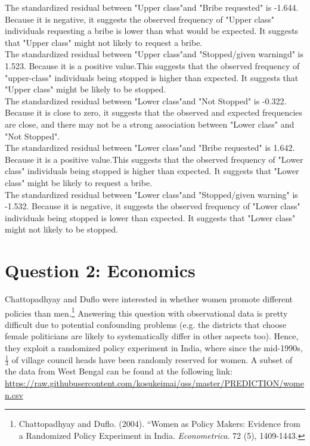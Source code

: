 \documentclass[12pt,letterpaper]{article}
\begin{document}
\begin{enumerate}
	
	The standardized residual between "Upper class"and "Bribe requested" is -1.644.  Because it is negative, it suggests the observed frequency of "Upper class" individuals requesting a bribe is lower than what would be expected. It suggests that "Upper class"  might not likely to request a bribe.\\
	
	
	The standardized residual between "Upper class"and "Stopped/given warningd" is 1.523.  Because it is a positive value.This suggests that the observed frequency of "upper-class" individuals being stopped is higher than expected. It suggests that "Upper class"  might be likely to be stopped.\\
	
	
	The standardized residual between "Lower class"and "Not Stopped" is -0.322.  Because it is close to zero, it suggests that the observed and expected frequencies are close, and there may not be a strong association between  "Lower class" and "Not Stopped".\\
	
	
	The standardized residual between "Lower class"and "Bribe requested" is 1.642.  Because it is a positive value.This suggests that the observed frequency of "Lower class" individuals being stopped is higher than expected. It suggests that "Lower class"  might be likely to request a bribe. \\
	
	
	The standardized residual between "Lower class"and "Stopped/given warning" is -1.532.  Because it is negative, it suggests the observed frequency of "Lower class" individuals being stopped is lower than expected.  It suggests that "Lower class"  might not likely to be stopped.\\
\end{enumerate}

\section*{Question 2: Economics}
Chattopadhyay and Duflo were interested in whether women promote different policies than men.\footnote{Chattopadhyay and Duflo. (2004). ``Women as Policy Makers: Evidence from a Randomized Policy Experiment in India. \textit{Econometrica}. 72 (5), 1409-1443.} Answering this question with observational data is pretty difficult due to potential confounding problems (e.g. the districts that choose female politicians are likely to systematically differ in other aspects too). Hence, they exploit a randomized policy experiment in India, where since the mid-1990s, $\frac{1}{3}$ of village council heads have been randomly reserved for women. A subset of the data from West Bengal can be found at the following link: \url{https://raw.githubusercontent.com/kosukeimai/qss/master/PREDICTION/women.csv}\\
\end{document}
